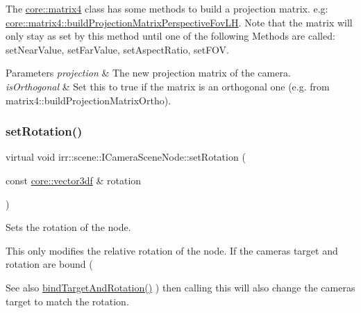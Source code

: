 The \hyperlink{namespaceirr_1_1core_a4c9d4e29899535971052810954a14431}{core\+::matrix4} class has some methods to build a projection matrix. e.\+g\+: \hyperlink{classirr_1_1core_1_1CMatrix4_a1895b967a8f8c9d7ad90fe5434f2499f}{core\+::matrix4\+::build\+Projection\+Matrix\+Perspective\+Fov\+LH}. Note that the matrix will only stay as set by this method until one of the following Methods are called\+: set\+Near\+Value, set\+Far\+Value, set\+Aspect\+Ratio, set\+F\+OV. 
\begin{DoxyParams}{Parameters}
{\em projection} & The new projection matrix of the camera. \\
\hline
{\em is\+Orthogonal} & Set this to true if the matrix is an orthogonal one (e.\+g. from matrix4\+::build\+Projection\+Matrix\+Ortho). \\
\hline
\end{DoxyParams}
\mbox{\label{classirr_1_1scene_1_1ICameraSceneNode_af95d5f50c192f212e11f3f050e92a470}} 
\subsubsection{\texorpdfstring{set\+Rotation()}{setRotation()}\hspace{0.1cm}{\footnotesize\ttfamily [1/2]}}
{\footnotesize\ttfamily virtual void irr\+::scene\+::\+I\+Camera\+Scene\+Node\+::set\+Rotation (\begin{DoxyParamCaption}\item[{const \hyperlink{namespaceirr_1_1core_ae6e2b2a6c552833ebbd5b7463d03586b}{core\+::vector3df} \&}]{rotation }\end{DoxyParamCaption})\hspace{0.3cm}{\ttfamily [pure virtual]}}



Sets the rotation of the node. 

This only modifies the relative rotation of the node. If the camera\textquotesingle{}s target and rotation are bound ( \begin{DoxySeeAlso}{See also}
\hyperlink{classirr_1_1scene_1_1ICameraSceneNode_ad8785d7b2f730933a8d4425ac54e7205}{bind\+Target\+And\+Rotation()} ) then calling this will also change the camera\textquotesingle{}s target to match the rotation. 
\end{DoxySeeAlso}

